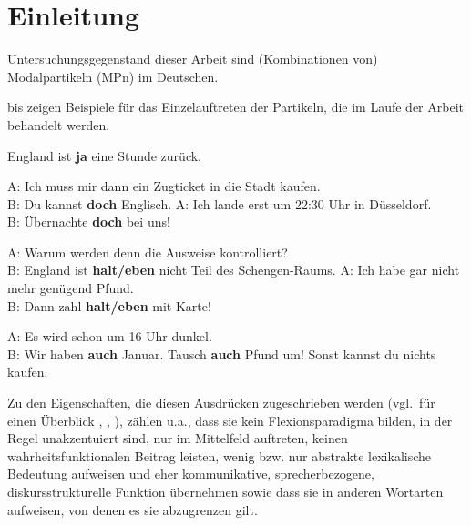\chapter{Einleitung}
\label{chapter:einleitung}
Untersuchungsgegenstand dieser Arbeit sind (Kombinationen von) Modalpartikeln (MPn) im Deutschen.

 bis  zeigen Beispiele für das Einzelauftreten der Partikeln, die im Laufe der Arbeit behandelt werden.

\begin{exe}
	\ex\label{1} 
		England ist \textbf{ja} eine Stunde zurück.	
\end{exe}

\begin{exe}
	\ex\label{2} 
		\begin{xlist}
		\ex\label{2a}A: Ich muss mir dann ein Zugticket in die Stadt kaufen. \\B: Du kannst \textbf{doch} Englisch.
		\ex\label{2b}A: Ich lande erst um 22:30 Uhr in Düsseldorf.\\B: Übernachte \textbf{doch} bei uns!	
	\end{xlist}
\end{exe}
\begin{exe}
	\ex\label{3} 
		\begin{xlist}
		\ex\label{3a}A: Warum werden denn die Ausweise kontrolliert? \\B: England ist \textbf{halt/eben} nicht Teil des Schengen-Raums.
		\ex\label{3b}A: Ich habe gar nicht mehr genügend Pfund.\\B: Dann zahl \textbf{halt/eben} mit Karte!
	\end{xlist}
\end{exe}
	
\begin{exe}
	\ex\label{4} 
		\begin{xlist}
		\ex\label{4a}A: Es wird schon um 16 Uhr dunkel. \\B: Wir haben \textbf{auch} Januar.
		\ex\label{4b}Tausch \textbf{auch} Pfund um! Sonst kannst du nichts kaufen.
	\end{xlist}
\end{exe}
Zu den Eigenschaften, die diesen Ausdrücken zugeschrieben werden (vgl.\ für einen Überblick \citealt{Diewald2007}, \citealt[628--630]{Thurmair2013}, \citealt[Kapitel 2]{Mueller2014b}), zählen u.a., dass sie kein Flexionsparadigma bilden, in der Regel unakzentuiert sind, nur im Mittelfeld auftreten, keinen wahrheitsfunktionalen Beitrag leisten, wenig bzw. nur abstrakte lexikalische Bedeutung aufweisen und eher kommunikative, spre\-cherbezogene, diskursstrukturelle Funktion übernehmen sowie dass sie  in anderen Wortarten aufweisen, von denen es sie abzugrenzen gilt.

